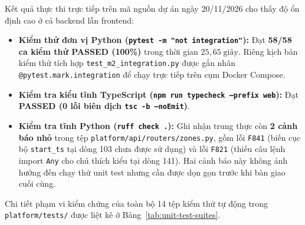 Kết quả thực thi trực tiếp trên mã nguồn dự án ngày 20/11/2026 cho thấy độ ổn định cao ở cả backend lẫn frontend:
\begin{itemize}[leftmargin=*]
    \item \textbf{Kiểm thử đơn vị Python (\texttt{pytest -m "not integration"}):} Đạt \textbf{58/58 ca kiểm thử PASSED (100\%)} trong thời gian \(25{,}65\;\text{giây}\). Riêng kịch bản kiểm thử tích hợp \texttt{test\_m2\_integration.py} được gắn nhãn \texttt{@pytest.mark.integration} để chạy trực tiếp trên cụm Docker Compose.
    \item \textbf{Kiểm tra kiểu tĩnh TypeScript (\texttt{npm run typecheck --prefix web}):} Đạt \textbf{PASSED (0 lỗi biên dịch \texttt{tsc -b --noEmit})}.
    \item \textbf{Kiểm tra tĩnh Python (\texttt{ruff check .}):} Ghi nhận trung thực còn \textbf{2 cảnh báo nhỏ} trong tệp \texttt{platform/api/routers/zones.py}, gồm lỗi \texttt{F841} (biến cục bộ \texttt{start\_ts} tại dòng 103 chưa được sử dụng) và lỗi \texttt{F821} (thiếu câu lệnh import \texttt{Any} cho chú thích kiểu tại dòng 141). Hai cảnh báo này không ảnh hưởng đến chạy thử unit test nhưng cần được dọn gọn trước khi bàn giao cuối cùng.
\end{itemize}

Chi tiết phạm vi kiểm chứng của toàn bộ 14 tệp kiểm thử tự động trong \texttt{platform/tests/} được liệt kê ở Bảng~\ref{tab:unit-test-suites}.

